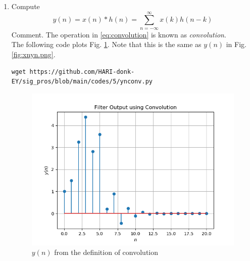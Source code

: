 \documentclass[journal,12pt,twocolumn]{IEEEtran}
\renewcommand\thesection{\arabic{section}}
\begin{document}
\begin{enumerate}[label=\thesection.\arabic*]
\item Compute 
%
\begin{equation}
\label{eq:convolution}
y(n) = x(n)*h(n) = \sum_{n=-\infty}^{\infty}x(k)h(n-k)
\end{equation}
%
Comment. The operation in \eqref{eq:convolution} is known as
{\em convolution}.
%
\\
\solution The following code plots Fig. \ref{fig:ynconv.png}. Note that this is the same as 
$y(n)$ in  Fig. 
\ref{fig:xnyn.png}. 
%
\begin{lstlisting}
wget https://github.com/HARI-donk-EY/sig_pros/blob/main/codes/5/ynconv.py
\end{lstlisting}
\begin{figure}[!ht]
\centering
\includegraphics[width=\columnwidth]{./figs/ynconv.png}
\caption{$y(n)$ from the definition of convolution}
\label{fig:ynconv.png}
\end{figure}


\end{enumerate}
\end{document}

